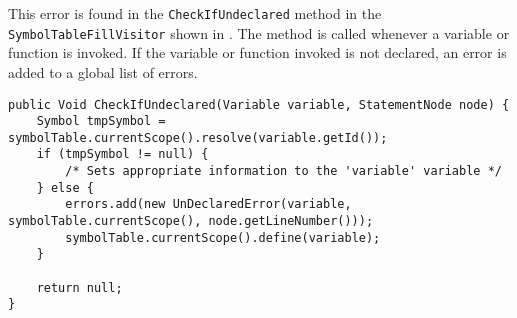 This error is found in the \texttt{CheckIfUndeclared} method in the \texttt{SymbolTableFillVisitor} shown in .
The method is called whenever a variable or function is invoked.
If the variable or function invoked is not declared, an error is added to a global list of errors. 
\begin{lstlisting}[caption=The CheckIfUndeclared method in the SymbolTableFillVisitor class in the \gls{gamble} compiler,numbers=none,frame=tlrb,label={lst:CheckIfUndeclared}]
public Void CheckIfUndeclared(Variable variable, StatementNode node) {
    Symbol tmpSymbol = symbolTable.currentScope().resolve(variable.getId());
    if (tmpSymbol != null) {
        /* Sets appropriate information to the 'variable' variable */
    } else {
        errors.add(new UnDeclaredError(variable, symbolTable.currentScope(), node.getLineNumber()));
        symbolTable.currentScope().define(variable);
    }

    return null;
}
\end{lstlisting}
